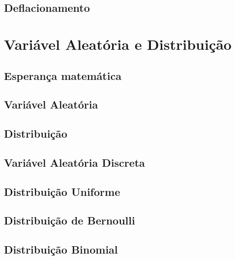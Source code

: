 \documentclass[
]{book}
\begin{document}
\hypertarget{deflacionamento}{%
\section{Deflacionamento}\label{deflacionamento}}

\hypertarget{variuxe1vel-aleatuxf3ria-e-distribuiuxe7uxe3o}{%
\chapter{Variável Aleatória e Distribuição}\label{variuxe1vel-aleatuxf3ria-e-distribuiuxe7uxe3o}}

\hypertarget{esperanuxe7a-matemuxe1tica}{%
\section{Esperança matemática}\label{esperanuxe7a-matemuxe1tica}}

\hypertarget{variuxe1vel-aleatuxf3ria}{%
\section{Variável Aleatória}\label{variuxe1vel-aleatuxf3ria}}

\hypertarget{distribuiuxe7uxe3o}{%
\section{Distribuição}\label{distribuiuxe7uxe3o}}

\hypertarget{variuxe1vel-aleatuxf3ria-discreta}{%
\section{Variável Aleatória Discreta}\label{variuxe1vel-aleatuxf3ria-discreta}}

\hypertarget{distribuiuxe7uxe3o-uniforme}{%
\section{Distribuição Uniforme}\label{distribuiuxe7uxe3o-uniforme}}

\hypertarget{distribuiuxe7uxe3o-de-bernoulli}{%
\section{Distribuição de Bernoulli}\label{distribuiuxe7uxe3o-de-bernoulli}}

\hypertarget{distribuiuxe7uxe3o-binomial}{%
\section{Distribuição Binomial}\label{distribuiuxe7uxe3o-binomial}}
\end{document}
